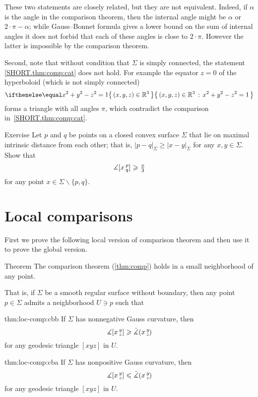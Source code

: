 These two statements are closely related, but they are not equivalent.
Indeed, if $\alpha$ is the angle in the comparison theorem, then the internal angle might be $\alpha$ or $2\cdot\pi-\alpha$; while Gauss--Bonnet formula gives a lower bound on the sum of internal angles it does not forbid that each of these angles is close to $2\cdot \pi$.
However the latter is impossible by the comparison theorem.

Second, note that without condition that $\Sigma$ is simply connected, the statement \ref{SHORT.thm:comp:cat} does not hold.
For example the equator $z=0$ of the hyperboloid (which is not simply connected)
\[\set{(x,y,z)\in\RR^3}{x^2+y^2-z^2=1}\]
forms a triangle with all angles $\pi$, which contradict the comparison in~\ref{SHORT.thm:comp:cat}.

\begin{thm}{Exercise}\label{ex:diam-angle}
Let $p$ and $q$ be points on a closed convex surface $\Sigma$ that lie on maximal intrinsic distance from each other;
that is, $|p-q|_\Sigma\ge|x-y|_\Sigma$ for any $x,y\in \Sigma$.
Show that 
\[\measuredangle[x\,{}^{p}_{q}]\geqslant \tfrac\pi3\]
for any point $x\in \Sigma\backslash\{p,q\}$.
\end{thm}


\section{Local comparisons}

First we prove the following local version of comparison theorem and then use it to prove the global version.

\begin{thm}{Theorem}\label{thm:loc-comp}
The comparison theorem (\ref{thm:comp}) holds in a small neighborhood of any point.

That is, if $\Sigma$ be a smooth regular surface without boundary,
then any point $p\in \Sigma$ admits a neighborhood $U\ni p$ such that 

\begin{subthm}{thm:loc-comp:cbb}
If $\Sigma$ has nonnegative Gauss curvature, then 
\[\measuredangle[x\,{}^{y}_{z}]\geqslant\tilde\measuredangle(x\,{}^{y}_{z}\hspace{-0.2ex})\]
for any geodesic triangle $[xyz]$ in $U$.
\end{subthm}

\begin{subthm}{thm:loc-comp:cba}
If $\Sigma$ has nonpositive Gauss curvature, then 
\[\measuredangle[x\,{}^{y}_{z}]\leqslant\tilde\measuredangle(x\,{}^{y}_{z}\hspace{-0.2ex})\]
for any geodesic triangle $[xyz]$ in $U$.
\end{subthm}
\end{thm}

